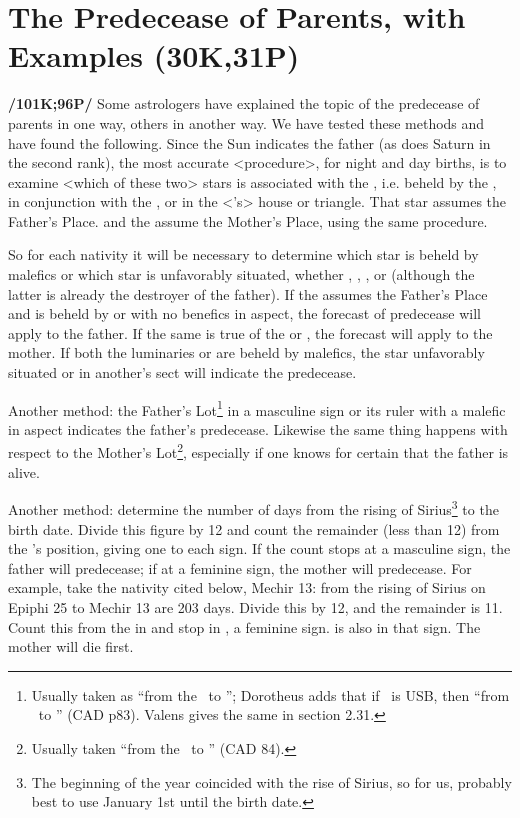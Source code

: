 \section{The Predecease of Parents, with Examples (30K,31P)}

\textbf{/101K;96P/} Some astrologers have explained the topic of the predecease of parents in one way, others in another
way. We have tested these methods and have found the following. Since the Sun indicates the father (as does Saturn in the second rank), the most accurate <procedure>, for night and day births, is to examine
<which of these two> stars is associated  with the \Moon, i.e. beheld by the \Moon, in conjunction with the \Moon, or in the <\Moon’s> house or triangle. That star assumes the Father’s Place. \Venus\xspace and the \Moon\xspace assume the Mother’s Place, using the same procedure. 

So for each nativity it will be necessary to determine which star is beheld by malefics or which star is unfavorably situated, whether \Sun, \Moon, \Venus, or \Saturn\xspace (although the latter is already the destroyer of the father). If the \Sun\xspace assumes the Father’s Place and is beheld by \Mars\xspace or \Saturn\xspace with no benefics in aspect, the forecast of predecease will apply to the father. If the same is true of the \Moon\xspace or \Venus, the forecast will apply to the mother. If both the luminaries or \Venus\xspace are beheld by malefics, the star unfavorably situated or in another’s sect will indicate the predecease.

Another method: the Father’s Lot\footnote{Usually taken as ``from the \Sun\, to \Saturn''; Dorotheus adds that if \Saturn\, is USB, then ``from \Mars\, to \Jupiter'' (CAD p83). Valens gives the same in section 2.31.} in a masculine sign or its ruler with a malefic in aspect indicates the father’s predecease. Likewise the same thing happens with respect to the Mother’s Lot\footnote{Usually taken ``from the \Moon\, to \Venus'' (CAD 84).}, especially if one knows for certain that the father is alive.

Another method: determine the number of days from the rising of Sirius\footnote{The beginning of the year coincided with the rise of Sirius, so for us, probably best to use January 1st until the birth date.} to the birth date. Divide this figure by 12 and count the remainder (less than 12) from the \Moon’s position, giving one to each sign. If the count stops at a masculine sign, the father will predecease; if at a feminine sign, the mother will
predecease. For example, take the nativity cited below, Mechir 13: from the rising of Sirius on Epiphi 25 to Mechir 13 are 203 days. Divide this by 12, and the remainder is 11. Count this from the \Moon\xspace in \Scorpio\xspace and stop in \Virgo, a feminine sign. \Mars\xspace is also in that sign. The mother will die first.

